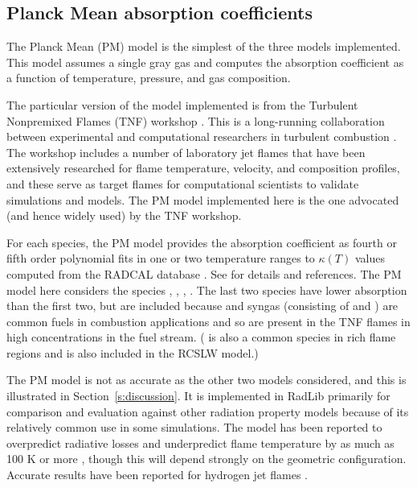 \documentclass[preprint,12pt]{elsarticle}
\begin{document}

\subsection{Planck Mean absorption coefficients} \label{s:planckmean}

The Planck Mean (PM) model is the simplest of the three models implemented. This model assumes a single gray gas and computes the absorption coefficient as a function of temperature, pressure, and gas composition. 

The particular version of the model implemented is from the Turbulent Nonpremixed Flames (TNF) workshop \cite{TNF}. This is a long-running collaboration between experimental and computational researchers in turbulent combustion \citep{Smith_2003,Barlow_2001}. The workshop includes a number of laboratory jet flames that have been extensively researched for flame temperature, velocity, and composition profiles, and these serve as target flames for computational scientists to validate simulations and models. The PM model implemented here is the one advocated (and hence widely used) by the TNF workshop. 

For each species, the PM model provides the absorption coefficient as fourth or fifth order polynomial fits in one or two temperature ranges to $\kappa(T)$ values computed from the RADCAL database \cite{Grosshandler_1993}. See \cite{TNF} for details and references. The PM model here considers the species , , , . The last two species have lower absorption than the first two, but are included because  and syngas (consisting of  and ) are common fuels in combustion applications and so are present in the TNF flames in high concentrations in the fuel stream. ( is also a common species in rich flame regions and is also included in the RCSLW model.) 

The PM model is not as accurate as the other two models considered, and this is illustrated in Section~\ref{s:discussion}. 
It is implemented in RadLib primarily for comparison and evaluation against other radiation property models because of its relatively common use in some simulations.
The model has been reported to overpredict radiative losses and underpredict flame temperature by as much as 100 K or more \cite{Frank_2000,Zhu_2002,Coelho_2002}, though this will depend strongly on the geometric configuration. Accurate results have been reported for hydrogen jet flames \cite{Barlow_1999}. 
\end{document}
